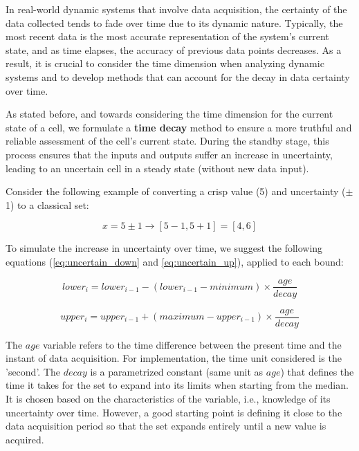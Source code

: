 In real-world dynamic systems that involve data acquisition, the certainty of the data collected tends to fade over time due to its dynamic nature. Typically, the most recent data is the most accurate representation of the system's current state, and as time elapses, the accuracy of previous data points decreases. As a result, it is crucial to consider the time dimension when analyzing dynamic systems and to develop methods that can account for the decay in data certainty over time.

As stated before, and towards considering the time dimension for the current state of a cell, we formulate a \textbf{time decay} method to ensure a more truthful and reliable assessment of the cell's current state. During the standby stage, this process ensures that the inputs and outputs suffer an increase in uncertainty, leading to an uncertain cell in a steady state (without new data input).

Consider the following example of converting a crisp value (5) and uncertainty ($\pm$1) to a classical set:

$$x = 5 \pm 1 \rightarrow [5-1, 5+1] = [4, 6]$$

To simulate the increase in uncertainty over time, we suggest the following equations (\ref{eq:uncertain_down} and \ref{eq:uncertain_up}), applied to each bound:

\begin{equation} \label{eq:uncertain_down}
lower_{i} = lower_{i-1} - (lower_{i-1} - minimum) \times \frac{age}{decay}
\end{equation}

\begin{equation} \label{eq:uncertain_up}
upper_{i} = upper_{i-1} + (maximum - upper_{i-1}) \times \frac{age}{decay}
\end{equation}

The $age$ variable refers to the time difference between the present time and the instant of data acquisition. For implementation, the time unit considered is the 'second'. The $decay$ is a parametrized constant (same unit as $age$) that defines the time it takes for the set to expand into its limits when starting from the median. It is chosen based on the characteristics of the variable, i.e., knowledge of its uncertainty over time. However, a good starting point is defining it close to the data acquisition period so that the set expands entirely until a new value is acquired.

